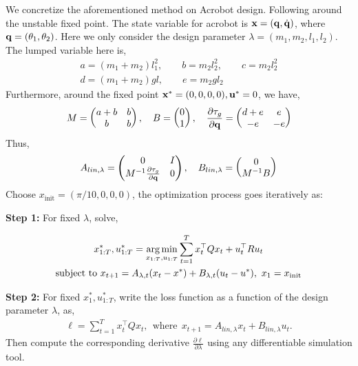 \documentclass[conference]{IEEEtran}
\begin{document}
We concretize the aforementioned method on Acrobot design. Following \cite{murray1991case} around the unstable fixed point. The state variable for acrobot is $\mathbf{x} = (\mathbf{q},\dot{\mathbf{q}})$, where $\mathbf{q} = (\theta_1,\theta_2)$. Here we only consider the design parameter $\lambda = (m_1,m_2,l_1,l_2)$. The lumped variable here is,
\begin{gather*}
a =  (m_1+m_2)l_1^2,\qquad b=m_2l_2^2,\qquad c=m_2l_2^2\\
d = (m_1+m_2)gl,\qquad  e=m_2gl_2  
\end{gather*}
Furthermore, around the fixed point $\mathbf{x}^* = (0,0,0,0), \mathbf{u}^* = 0$, we have,
\begin{align*}
M = 
\begin{pmatrix}
a+b&b\\
b&b
\end{pmatrix},\quad
B = 
\begin{pmatrix}
0\\
1
\end{pmatrix},\quad
\frac{\partial \tau_g}{\partial \mathbf{q}} =
\begin{pmatrix}
d+e&e\\
-e&-e
\end{pmatrix}
\end{align*}
Thus,
\begin{align*}
A_{lin,\lambda} = 
\begin{pmatrix}
0 & I\\
M^{-1} \frac{\partial \tau_g}{\partial \mathbf{q}} & 0
\end{pmatrix},\quad
B_{lin,\lambda} =
\begin{pmatrix}
0 \\
M^{-1}B
\end{pmatrix}
\end{align*}
Choose $x_{\text{init}} = (\pi/10,0,0,0)$, the optimization process goes iteratively as:


\textbf{Step 1:}
For fixed $\lambda$, solve,

\begin{gather*}
    x_{1:T}^*, u_{1:T}^*= \operatorname*{arg\,min}\limits_{x_{1:T},u_{1:T}} \sum\limits_{t=1}^{T} x_t^\top Q x_t + u_t^\top R u_t \\
    \text{subject to~} x_{t+1} = A_{\lambda,t}(x_t - x^*) + B_{\lambda,t}(u_t-u^*) ,~x_1 = x_{\text{init}}
\end{gather*}

\textbf{Step 2:}
For fixed $x_1^*, u_{1:T}^*$, write the loss function as a function of the design parameter $\lambda$, as,
\begin{align*}
\ell = \sum\limits_{t=1}^{T} x_t^\top Q x_t,~~\text{where}~~ x_{t+1} = A_{lin,\lambda}x_t + B_{lin,\lambda}u_t.
\end{align*}
Then compute the corresponding derivative $\frac{\partial \ell}{\partial \lambda}$ using any differentiable simulation tool.
\end{document}
